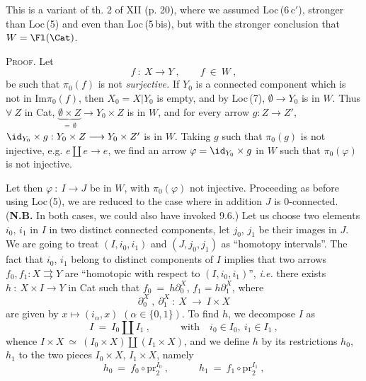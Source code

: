 This is a variant of th. 2 of XII (p. 20), where we assumed Loc\,(6\,c$'$), stronger than Loc\,(5) and even than Loc\,(5\,bis), but with the stronger conclusion that $W=\Fl(\Cat)$.

\textsc{Proof}. Let
\[
f\ :\ X\longrightarrow Y\ ,\qquad f\ \in\ W\ ,
\]
be such that $\pi_0(f)$ is not \textit{surjective.} If $Y_0$ is a connected component which is not in $\mathrm{Im}\pi_0(f)$, then $X_0=X|Y_0$ is empty, and by Loc\,(7), $\emptyset\longrightarrow Y_0$ is in $W$. Thus $\forall\ Z$ in Cat, %
$\underbrace{\emptyset\times Z}_{=\,\emptyset}\longrightarrow Y_0\times Z$ is in $W$, and for every arrow $g : Z\longrightarrow Z'$, $\id_{Y_0}\times g : Y_0\times Z\longrightarrow Y_0\times Z'$ is in $W$. Taking $g$ such that $\pi_0(g)$ is not injective, e.g. $e\amalg e\longrightarrow e$, we find an arrow $\varphi=\id_{Y_0}\times g$ in $W$ such that $\pi_0(\varphi)$ is not injective.


Let then $\varphi\ :\ I\longrightarrow J$ be in $W$, with $\pi_0(\varphi)$ not injective. Proceeding as before using Loc\,(5), we are reduced to the case where in addition $J$ is $0$-connected. (\textbf{N.B.} In both cases, we could also have invoked 9.6.) Let us choose two elements $i_0$, $i_1$ in $I$ in two distinct connected components, let $j_0$, $j_1$ be their images in $J$. We are going to treat $(I,i_0,i_1)$ and $(J,j_0,j_1)$ as ``homotopy intervals''. The fact that $i_0$, $i_1$ belong to distinct components of $I$ implies that two arrows $f_0,f_1 : X\rightrightarrows Y$ are ``homotopic with respect to $(I,i_0,i_1)$'', \textit{i.e.} there exists $h\ :\ X\times I\longrightarrow Y$ in Cat such that $f_0\ =\ h\partial_0^X$, $f_1=h\partial_1^X$, where
\[
\partial_0^X\ ,\ \partial_1^X\ :\ X\ \longrightarrow\ I\times X
\]
are given by $x\longmapsto(i_\alpha,x)$ $(\alpha\in\{0,1\})$. To find $h$, we decompose $I$ as
\[
I\ =\ I_0\amalg I_1\ ,\qquad\quad \text{with}\quad i_0\in I_0,\ i_1\in I_1\ ,
\]
whence $I\times X\ \simeq\ (I_0\times X)\amalg(I_1\times X)$, and we define $h$ by its restrictions $h_0$, $h_1$ to the two pieces $I_0\times X$, $I_1\times X$, namely
\[
h_0\ =\ f_0\circ\mathrm{pr}_2^{I_0}\ ,\qquad\quad h_1\ =\ f_1\circ\mathrm{pr}_2^{I_1}\ ,
\]